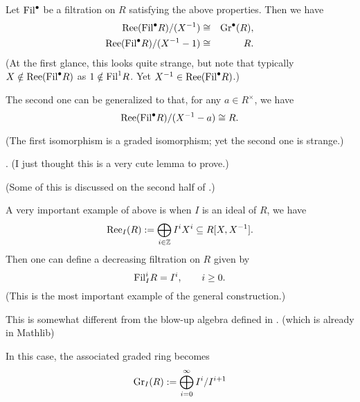 	
	\begin{lemma}
		\label{L:quotient of Rees algebra}
		Let $\mathrm{Fil}^\bullet$ be a filtration on $R$ satisfying the above properties. Then we have
		\begin{eqnarray*}
			\mathrm{Ree}(\mathrm{Fil}^\bullet R) / (X^{-1}) &\cong& \mathrm{Gr}^\bullet(R),\\
			\mathrm{Ree}(\mathrm{Fil}^\bullet R) / (X^{-1}-1) & \cong & R.
		\end{eqnarray*}
		(At the first glance, this looks quite strange, but note that typically $X \notin \mathrm{Ree}(\mathrm{Fil}^\bullet R)$ as $1 \notin \mathrm{Fil}^1R$.  Yet $X^{-1} \in \mathrm{Ree}(\mathrm{Fil}^\bullet R)$.)
		
		The second one can be generalized to that, for any $a \in R^\times$, we have
		$$
		\mathrm{Ree}(\mathrm{Fil}^\bullet R) /(X^{-1}-a) \cong R.
		$$
		
		(The first isomorphism is a graded isomorphism; yet the second one is strange.)
		
		\cite[Page 170]{eisenbud}. (I just thought this is a very cute lemma to prove.)
		
		(Some of this is discussed on the second half of \cite[page 120]{matsumura-ring}.)
	\end{lemma}
	
	\begin{example}
		A very important example of above is when $I$ is an ideal of $R$, we have
		$$
		\mathrm{Ree}_I(R): = \bigoplus_{i \in \mathbb{Z}} I^i X^i \subseteq R[X, X^{-1}].
		$$
		Then one can define a decreasing filtration on $R$ given by
		$$
		\mathrm{Fil}^i_IR = I^i, \qquad i \geq 0.
		$$
		(This is the most important example of the general construction.)
		
		This is somewhat different from the blow-up algebra defined in \cite[\href{https://stacks.math.columbia.edu/tag/052Q}{Definition 052Q}]{stacks-project}.
		(which is already in Mathlib)
		
		In this case, the associated graded ring becomes 
		$$
		\mathrm{Gr}_I(R): = \bigoplus_{i=0}^\infty I^i/I^{i+1}
		$$
	\end{example}
	
